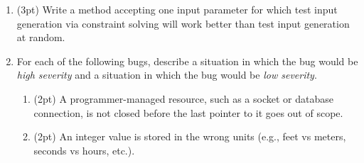 \documentclass{report}
\newif\ifkey
\newcommand{\answerlong}[1]{\ifkey\color{red}\textbf{#1}\color{black}\else\vspace{0.5in}\fi\xspace}
\newcommand*{\pts}[1]{\addtocounter{points}{#1}(#1pt)}
\begin{document}
\begin{spacing}{1.4}
\begin{enumerate}[leftmargin=*]
  \item \pts{3}  Write a method accepting one input parameter for which test input generation
    via constraint solving will work better than test input generation at random.\\
    \answerlong{Answers vary. The key idea is to include a very specific test. For example:\\
      \begin{lstlisting}
        int foo(int x) {
          if (x == 10) return 0;
          else return 1;
        }
      \end{lstlisting}
    }

  \item For each of the following bugs, describe a situation in which the bug would be \emph{high severity}
    and a situation in which the bug would be \emph{low severity}.
    \begin{enumerate}
    \item \pts{2} A programmer-managed resource, such as a socket or database connection, is not closed before
      the last pointer to it goes out of scope.\\
      \answerlong{High severity: a long-running program, such as a webserver, which may eventually run out of resources.
        Low severity: a short-running program, such as one that sends a single ping and then exits: the resource will
        be freed when the program ends, anyway. Other examples are possible.}
    \item \pts{2} An integer value is stored in the wrong units (e.g., feet vs meters, seconds vs hours, etc.).\\
      \answerlong{High severity: Mars polar orbiter crash. Low severity: the integer value is part of a game
        and is only displayed to the user: e.g., it doesn't matter if an imaginary car's speed is in m/s or mph.
        Other answers are possible.}
      \end{enumerate}


\end{enumerate}
\end{spacing}
\end{document}
